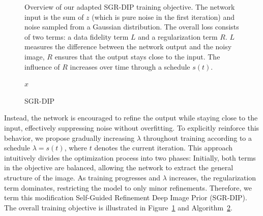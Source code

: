 \begin{figure}
\begin{tikzpicture}[scale=1]
    \end{tikzpicture}
    \caption{
        Overview of our adapted SGR-DIP training objective.
        The network input is the sum of $z$ (which is pure noise in the first iteration) and noise sampled from a Gaussian distribution.
        The overall loss consists of two terms: a data fidelity term $L$ and a regularization term $R$.
        $L$ measures the difference between the network output and the noisy image, $R$ ensures that the output stays close to the input.
        The influence of $R$ increases over time through a schedule $s(t)$.
    }\label{fig:SGR-DIP}
\end{figure}

\begin{figure}
    \begin{algorithm}[H]
        \caption{SGR-DIP}\label{alg:SGR-DIP}
        \Return $\hat{x}$
    \end{algorithm}
\end{figure}

Instead, the network is encouraged to refine the output while staying close to the input, effectively suppressing noise without overfitting.
To explicitly reinforce this behavior, we propose gradually increasing $\lambda$ throughout training according to a schedule $\lambda = s(t)$, where $t$ denotes the current iteration.
This approach intuitively divides the optimization process into two phases:
Initially, both terms in the objective are balanced, allowing the network to extract the general structure of the image. As training progresses and $\lambda$ increases, the regularization term dominates, restricting the model to only minor refinements.
Therefore, we term this modification Self-Guided Refinement Deep Image Prior (SGR-DIP).
The overall training objective is illustrated in Figure~\ref{fig:SGR-DIP} and Algorithm~\ref{alg:SGR-DIP}.

